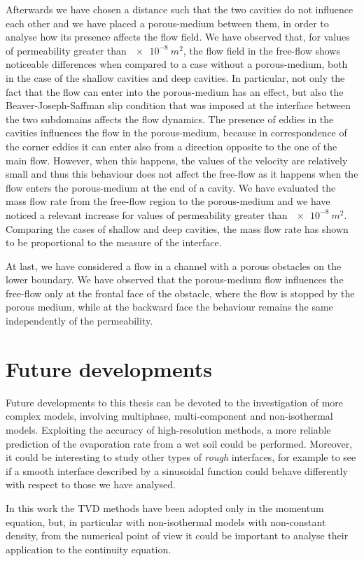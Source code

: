 Afterwards we have chosen a distance such that the two cavities do not 
influence each other and we have placed a porous-medium between them, in order 
to analyse how its presence affects the flow field. We have observed that, 
for values of permeability greater than $\SI{e-8}{m^2}$, the flow field in the 
free-flow shows noticeable differences when compared to a case without a 
porous-medium, both in the case of the shallow cavities and deep cavities.
In particular, not only the fact that the flow can enter into 
the porous-medium has an effect, but also the Beaver-Joseph-Saffman slip 
condition that was imposed at the interface between the two subdomains affects the flow dynamics.
The presence of eddies in the cavities influences the flow in the 
porous-medium, because in correspondence of the corner eddies it can enter also 
from a direction opposite to the one of the main flow. However, when this 
happens, the values of the velocity are relatively small and thus this 
behaviour does not affect the free-flow as it happens when the flow enters the 
porous-medium at the end of a cavity. We have evaluated the mass flow 
rate from the free-flow region to the porous-medium and we have noticed a 
relevant 
increase for values of permeability greater than $\SI{e-8}{m^2}$. Comparing 
the cases of shallow and deep cavities, the mass flow rate has shown to be 
proportional to the measure of the interface.

At last, we have considered a flow in a channel with a porous obstacles on the 
lower boundary. We have observed that the porous-medium flow influences the 
free-flow only at the frontal face of the obstacle, where the flow is stopped 
by the porous medium, while at the backward face the behaviour remains the same 
independently of the permeability.
%
\section{Future developments}
Future developments to this thesis can be devoted to the investigation of more 
complex models, involving multiphase, multi-component and non-isothermal 
models. Exploiting the accuracy of high-resolution methods, a more reliable 
prediction of the evaporation rate from a wet soil could be performed. 
Moreover, it could be interesting to study other types of \emph{rough} 
interfaces, for example to see if a smooth interface described by a sinusoidal 
function could behave differently with respect to those we have analysed.

In this work the TVD methods have been adopted only in the momentum equation, 
but, in particular with non-isothermal models with non-constant density, from 
the numerical point of view it could be important to analyse their 
application to the continuity equation.

